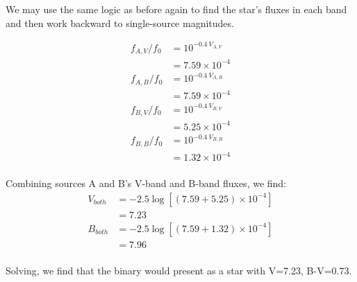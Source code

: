 \documentclass[12pt]{article}
\newenvironment{answer}[2][Answer]{\begin{trivlist}
\item[\hskip \labelsep {\bfseries #1}\hskip \labelsep {\bfseries #2.}]}{\end{trivlist}}
\begin{document}
\begin{answer}{5}
  We may use the same logic as before again to find the star's fluxes in each band and then work backward to single-source magnitudes.

  \begin{align*}
    f_{A, V}/f_0 &= 10^{-0.4\ V_{A, V}} \\
                 &= 7.59 \times 10^{-4} \\
    f_{A, B}/f_0 &= 10^{-0.4\ V_{A, B}} \\
                 &= 7.59 \times 10^{-4} \\
    f_{B, V}/f_0 &= 10^{-0.4\ V_{B, V}} \\
                &= 5.25 \times 10^{-4} \\
    f_{B, B}/f_0 &= 10^{-0.4\ V_{B, B}} \\
                &= 1.32 \times 10^{-4} \\
  \end{align*}

  Combining sources A and B's V-band and B-band fluxes, we find:
  \begin{align*}
    V_{both} &= -2.5 \log{[(7.59 + 5.25) \times 10^{-4}]} \\
               &= 7.23 \\
    B_{both} &= -2.5 \log{[(7.59 + 1.32) \times 10^{-4}]} \\
              &= 7.96 \\
  \end{align*}

Solving, we find that the binary would present as a star with V=7.23, B-V=0.73.


\end{answer}





\vfill\eject
\clearpage





\end{document}
